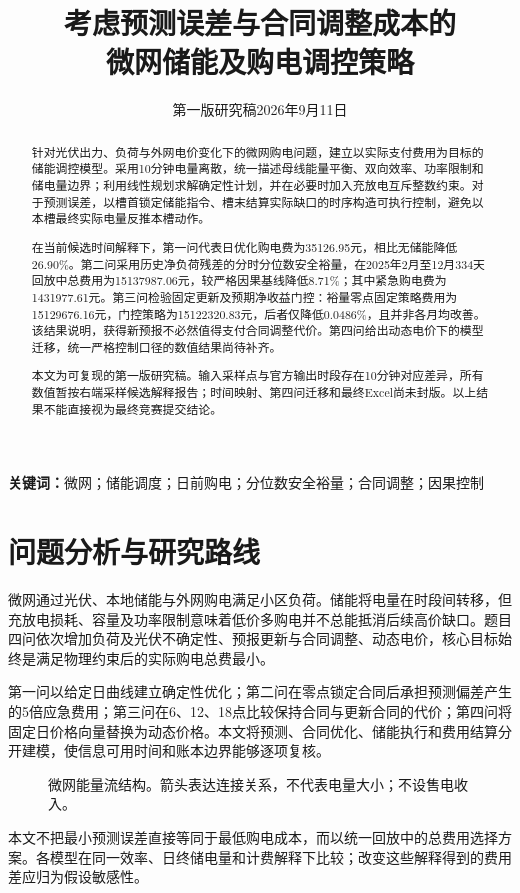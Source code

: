 \documentclass[UTF8,a4paper,zihao=-4,fontset=fandol]{ctexart}
\title{考虑预测误差与合同调整成本的\\微网储能及购电调控策略}
\author{}\date{第一版研究稿\quad 2026年9月11日}
\begin{document}
\maketitle\vspace{-2em}
\begin{abstract}
针对光伏出力、负荷与外网电价变化下的微网购电问题，建立以实际支付费用为目标的储能调控模型。采用10分钟电量离散，统一描述母线能量平衡、双向效率、功率限制和储电量边界；利用线性规划求解确定性计划，并在必要时加入充放电互斥整数约束。对于预测误差，以槽首锁定储能指令、槽末结算实际缺口的时序构造可执行控制，避免以本槽最终实际电量反推本槽动作。

在当前候选时间解释下，第一问代表日优化购电费为35126.95元，相比无储能降低26.90\%。第二问采用历史净负荷残差的分时分位数安全裕量，在2025年2月至12月334天回放中总费用为15137987.06元，较严格因果基线降低8.71\%；其中紧急购电费为1431977.61元。第三问检验固定更新及预期净收益门控：裕量零点固定策略费用为15129676.16元，门控策略为15122320.83元，后者仅降低0.0486\%，且并非各月均改善。该结果说明，获得新预报不必然值得支付合同调整代价。第四问给出动态电价下的模型迁移，统一严格控制口径的数值结果尚待补齐。

本文为可复现的第一版研究稿。输入采样点与官方输出时段存在10分钟对应差异，所有数值暂按右端采样候选解释报告；时间映射、第四问迁移和最终Excel尚未封版。以上结果不能直接视为最终竞赛提交结论。
\end{abstract}
\noindent\textbf{关键词：}微网；储能调度；日前购电；分位数安全裕量；合同调整；因果控制
\newpage
\section{问题分析与研究路线}
微网通过光伏、本地储能与外网购电满足小区负荷。储能将电量在时段间转移，但充放电损耗、容量及功率限制意味着低价多购电并不总能抵消后续高价缺口。题目四问依次增加负荷及光伏不确定性、预报更新与合同调整、动态电价，核心目标始终是满足物理约束后的实际购电总费最小\cite{problem}。

第一问以给定日曲线建立确定性优化；第二问在零点锁定合同后承担预测偏差产生的5倍应急费用；第三问在6、12、18点比较保持合同与更新合同的代价；第四问将固定日价格向量替换为动态价格。本文将预测、合同优化、储能执行和费用结算分开建模，使信息可用时间和账本边界能够逐项复核。
\begin{figure}[H]\centering
{}
\caption{微网能量流结构。箭头表达连接关系，不代表电量大小；不设售电收入。}
\end{figure}
本文不把最小预测误差直接等同于最低购电成本，而以统一回放中的总费用选择方案。各模型在同一效率、日终储电量和计费解释下比较；改变这些解释得到的费用差应归为假设敏感性。
\end{document}
